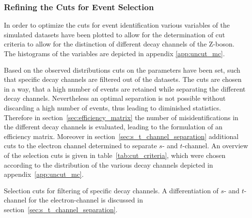 \documentclass[11pt, a4paper]{article}
\numberwithin{equation}{section}
\begin{document}
\subsubsection{Refining the Cuts for Event Selection}
In order to optimize the cuts for event identification various variables of the simulated datasets have been plotted to allow for the determination of cut criteria to allow for the distinction of different decay channels of the Z-boson.
The histograms of the variables are depicted in appendix \ref{app:uncut_mc}.

Based on the observed distributions cuts on the parameters have been set, such that specific decay channels are filtered out of the datasets.
The cuts are chosen in a way, that a high number of events are retained while separating the different decay channels.
Nevertheless an optimal separation is not possible without discarding a high number of events, thus leading to diminished statistics.
Therefore in section~\ref{sec:efficiency_matrix} the number of misidentifications in the different decay channels is evaluated, leading to the formulation of an efficiency matrix.
Moreover in section~\ref{sec:s_t_channel_separation} additional cuts to the electron channel determined to separate $s$- and $t$-channel.
An overview of the selection cuts is given in table~\ref{tab:cut_criteria}, which were chosen according to the distribution of the various decay channels depicted in appendix~\ref{app:uncut_mc}.
\begin{table}[h]
	\centering
	
	\caption{Selection cuts for filtering of specific decay channels. A differentiation of $s$- and $t$-channel for the electron-channel is discussed in section~\ref{sec:s_t_channel_separation}.}
	\label{tab:cut_criteria}
\end{table}
\end{document}
